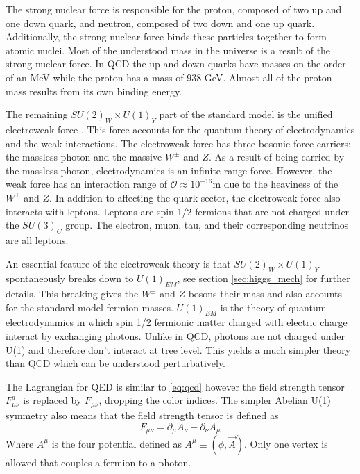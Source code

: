 The strong nuclear force is responsible for the proton, composed of two up and one down quark, and neutron, composed of two down and one up quark.
Additionally, the strong nuclear force binds these particles together to form atomic nuclei.
Most of the understood mass in the universe is a result of the strong nuclear force.
In QCD the up and down quarks have masses on the order of an MeV while the proton has a mass of 938 GeV.
Almost all of the proton mass results from its own binding energy.

The remaining $SU(2)_W\times U(1)_Y$ part of the standard model is the unified electroweak force \cite{Salam:1964ry, Weinberg:1967tq, Guralnik:1964eu, PhysRevLett.13.508, Higgs1964132, Englert:1964et, Glashow1961579}.
This force accounts for the quantum theory of electrodynamics and the weak interactions.
The electroweak force has three bosonic force carriers: the massless photon and the massive $W^\pm$ and $Z$.
As a result of being carried by the massless photon, electrodynamics is an infinite range force.
However, the weak force has an interaction range of $\mathcal{O}\approx10^{-16}$m due to the heaviness of the $W^{\pm}$ and $Z$.
In addition to affecting the quark sector, the electroweak force also interacts with leptons.
Leptons are spin 1/2 fermions that are not charged under the $SU(3)_C$ group. 
The electron, muon, tau, and their corresponding neutrinos are all leptons.

An essential feature of the electroweak theory is that $SU(2)_W\times U(1)_Y$ spontaneously breaks down to $U(1)_{EM}$, see section \ref{sec:higgs_mech} for further details.
This breaking gives the $W^\pm$ and $Z$ bosons their mass and also accounts for the standard model fermion masses.
$U(1)_{EM}$ is the theory of quantum electrodynamics in which spin 1/2 fermionic matter charged with electric charge interact by exchanging photons.
Unlike in QCD, photons are not charged under U(1) and therefore don't interact at tree level.
This yields a much simpler theory than QCD which can be understood perturbatively.

The Lagrangian for QED is similar to \ref{eq:qcd} however the field strength tensor $F^a_{\mu\nu}$ is replaced by $F_{\mu\nu}$, dropping the color indices.
The simpler Abelian U(1) symmetry also means that the field strength tensor is defined as
\begin{equation}
  F_{\mu\nu}=\partial_\mu A_\nu - \partial_\nu A_\mu
\end{equation}
Where $A^\mu$ is the four potential defined as $A^\mu \equiv (\phi, \vec{A})$.
Only one vertex is allowed that couples a fermion to a photon.

